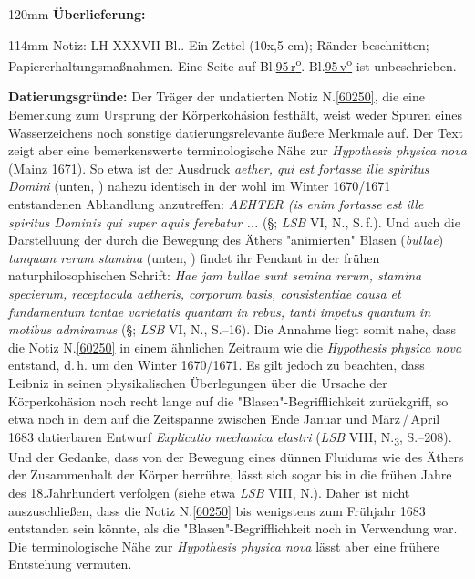 %
\frenchspacing%
\begin{ledgroupsized}[r]{120mm}%
\footnotesize%
\pstart%
\noindent%
\textbf{Überlieferung:}%
\pend%
\end{ledgroupsized}%
\begin{ledgroupsized}[r]{114mm}%
\footnotesize%
\pstart%
\parindent -6mm%
%
Notiz:
LH XXXVII Bl..
Ein Zettel (10\;x,5 cm);
Ränder beschnitten;
Papier\-erhal\-tungs\-maßnahmen.
Eine Seite auf Bl.\;\href{\Scan{LH_37_04_095r}}{95\,r\textsuperscript{o}}.
Bl.\;\href{\Scan{LH_37_04_095v}}{95\,v\textsuperscript{o}} ist unbeschrieben.
\pend%
\end{ledgroupsized}%
\vspace{5mm}%
\begin{ledgroup}%
\footnotesize%
\pstart%
\noindent%
\textbf{Datierungsgründe:}
Der Träger der undatierten Notiz N.\;\ref{60250}, die eine Bemerkung zum Ursprung der Körperkohäsion festhält, weist weder Spuren eines Wasserzeichens noch sonstige datierungsrelevante äußere Merkmale auf. %
Der Text zeigt aber eine bemerkenswerte terminologische Nähe zur \textit{Hypothesis physica nova} (Mainz 1671).\cite{00256} %
So etwa ist der Ausdruck \textit{aether, qui est fortasse ille spiritus Domini} (unten, ) nahezu identisch in der wohl im Winter 1670/1671 entstandenen Abhandlung anzutreffen:
\textit{AEHTER (is enim fortasse est ille spiritus Dominis qui super aquis ferebatur ...} (§; \textit{LSB} VI, N., S.\,f.).\cite{00256}
Und auch die Darstelluung der durch die Bewegung des Äthers "animierten" Blasen (\textit{bullae}) \textit{tanquam rerum stamina} (unten, ) findet ihr Pendant in der frühen naturphilosophischen Schrift:
\textit{Hae jam bullae sunt semina rerum, stamina specierum, receptacula aetheris, corporum basis, consistentiae causa et fundamentum tantae varietatis quantam in rebus, tanti impetus quantum in motibus admiramus} (§; \textit{LSB} VI, N., S.--16).\cite{00256}
Die Annahme liegt somit nahe, dass die Notiz N.\;\ref{60250} in einem ähnlichen Zeitraum wie die \textit{Hypothesis physica nova}\cite{00256} entstand, d.\,h. um den Winter 1670/1671.
\pend%
\pstart%
Es gilt jedoch zu beachten, dass Leibniz in seinen physikalischen Überlegungen über die Ursache der Körperkohäsion noch recht lange auf die "Blasen"-Begrifflichkeit zurückgriff, so etwa noch in dem auf die Zeitspanne zwischen Ende Januar und März\,/\,April 1683 datierbaren Entwurf \textit{Explicatio mechanica elastri} (\textit{LSB} VIII, N.\textsubscript{3}, S.--208).\cite{01437}
Und der Gedanke, dass von der Bewegung eines dünnen Fluidums wie des Äthers der Zusammenhalt der Körper herrühre, lässt sich sogar bis in die frühen Jahre des 18.\;Jahrhundert verfolgen (siehe etwa \textit{LSB} VIII, N.).\cite{02608}
Daher ist nicht auszuschließen, dass die Notiz N.\;\ref{60250} bis wenigstens zum Frühjahr 1683 entstanden sein könnte, als die "Blasen"-Begrifflichkeit noch in Verwendung war.
Die terminologische Nähe zur \textit{Hypothesis physica nova}\cite{00256} lässt aber eine frühere Entstehung vermuten.%
\pend%
\end{ledgroup}%
